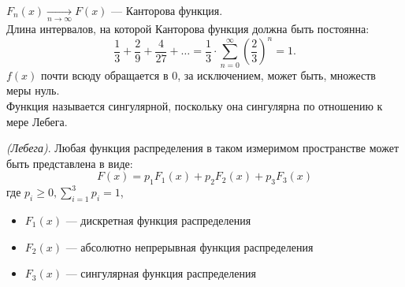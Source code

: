 \begin{example}
	$F_n(x) \underset{n \to \infty}{\rightarrow} F(x)$ --- Канторова функция. \\
	Длина интервалов, на которой Канторова функция должна быть постоянна:
	\[
		\frac{1}{3} + \frac{2}{9} + \frac{4}{27} + \ldots = \frac{1}{3} \cdot \sum\limits_{n = 0}^\infty \left(\frac{2}{3}\right)^n = 1.
	\]
	$f(x)$ почти всюду обращается в 0, за исключением, может быть, множеств меры нуль. \\
	Функция называется сингулярной, поскольку она сингулярна по отношению к мере Лебега.
\end{example}
\begin{theorem} \textit{(Лебега)}.  
	Любая функция распределения в таком измеримом пространстве может быть представлена в виде:
	\[
		F(x) = p_1 F_1(x) + p_2 F_2(x) + p_3 F_3(x)
	\]
	где $p_i \geqslant 0, \sum\limits_{i=1}^3 p_i = 1$,
	\begin{itemize}
		\item $F_1 (x)$ --- дискретная функция распределения
		\item $F_2 (x)$ --- абсолютно непрерывная функция распределения
		\item $F_3 (x)$ --- сингулярная функция распределения
	\end{itemize}
\end{theorem}

\setcounter{equation}{0}

